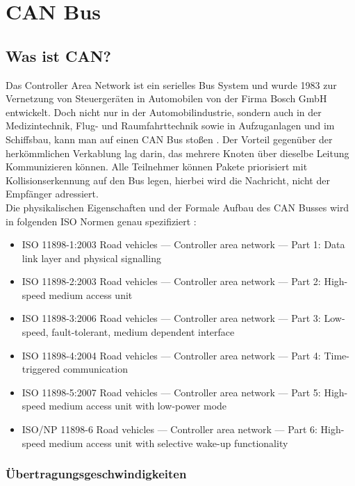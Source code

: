 \section{CAN Bus}

\subsection{Was ist CAN?}
	
Das Controller Area Network ist ein serielles Bus System und wurde
1983 zur Vernetzung von Steuergeräten in Automobilen von der Firma
Bosch GmbH entwickelt. Doch nicht nur in der Automobilindustrie,
sondern auch in der Medizintechnik, Flug- und Raumfahrttechnik sowie
in Aufzuganlagen und im Schiffsbau, kann man auf einen CAN Bus stoßen
\citep[nach][]{WI1}. Der Vorteil gegenüber der herkömmlichen Verkablung
lag darin, das mehrere Knoten über dieselbe Leitung Kommunizieren
können. Alle Teilnehmer können Pakete priorisiert mit
Kollisionserkennung auf den Bus legen, hierbei wird die Nachricht,
nicht der Empfänger adressiert.
\\
Die physikalischen Eigenschaften und der Formale Aufbau des CAN Busses
wird in folgenden ISO Normen genau spezifiziert \citep[nach][]{WI1}:

\begin{itemize}
\item ISO 11898-1:2003 Road vehicles — Controller area network — 
Part 1: Data link layer and physical signalling
\item ISO 11898-2:2003 Road vehicles — Controller area network — 
Part 2: High-speed medium access unit
\item ISO 11898-3:2006 Road vehicles — Controller area network — 
Part 3: Low-speed, fault-tolerant, medium dependent interface
\item ISO 11898-4:2004 Road vehicles — Controller area network — 
Part 4: Time-triggered communication
\item ISO 11898-5:2007 Road vehicles — Controller area network — 
Part 5: High-speed medium access unit with low-power mode
\item ISO/NP 11898-6 Road vehicles — Controller area network — 
Part 6: High-speed medium access unit with selective wake-up functionality
\end{itemize}

\subsubsection{Übertragungsgeschwindigkeiten}

